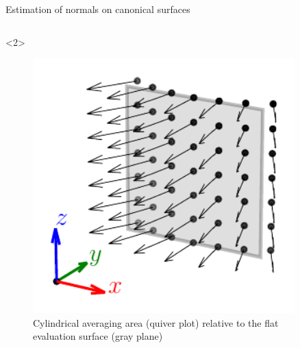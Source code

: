\documentclass[xcolor=dvipsnames,10pt]{beamer}
\begin{document}
\begin{frame}{Estimation of normals on canonical surfaces}
\begin{columns}[c]
\begin{column}{0.3\textwidth}
\begin{onlyenv}
            \end{onlyenv}
            \begin{onlyenv}<2>
            \begin{center}
                \begin{figure}
                    \includegraphics[width=0.9\textwidth]{artwork/eval_cylindrical.pdf}
                    \caption{Cylindrical averaging area (quiver plot) relative to the flat evaluation surface (gray plane)}
                \end{figure}
            \end{center}
            \end{onlyenv}
        \end{column}
    \end{columns}
\end{frame}
\end{document}
